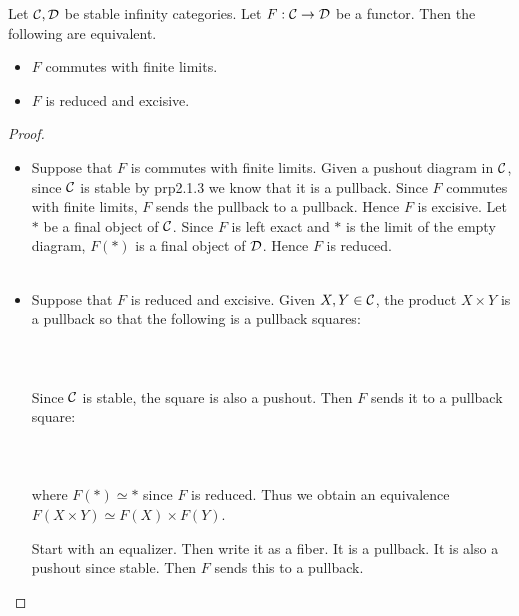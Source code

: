 \documentclass[a4paper]{article}
\begin{document}
\begin{prp}{}{} Let $\mathcal{C},\mathcal{D}$ be stable infinity categories. Let $F:\mathcal{C}\to\mathcal{D}$ be a functor. Then the following are equivalent. 
\begin{itemize}
\item $F$ commutes with finite limits. 
\item $F$ is reduced and excisive. 
\end{itemize} \tcbline
\begin{proof}~\\
\begin{itemize}
\item Suppose that $F$ is commutes with finite limits. Given a pushout diagram in $\mathcal{C}$, since $\mathcal{C}$ is stable by prp2.1.3 we know that it is a pullback. Since $F$ commutes with finite limits, $F$ sends the pullback to a pullback. Hence $F$ is excisive. Let $\ast$ be a final object of $\mathcal{C}$. Since $F$ is left exact and $\ast$ is the limit of the empty diagram, $F(\ast)$ is a final object of $\mathcal{D}$. Hence $F$ is reduced. \\~\\
\item Suppose that $F$ is reduced and excisive. Given $X,Y\in\mathcal{C}$, the product $X\times Y$ is a pullback so that the following is a pullback squares: \\~\\
\\~\\
Since $\mathcal{C}$ is stable, the square is also a pushout. Then $F$ sends it to a pullback square: \\~\\
\\~\\
where $F(\ast)\simeq\ast$ since $F$ is reduced. Thus we obtain an equivalence $F(X\times Y)\simeq F(X)\times F(Y)$. 



Start with an equalizer. Then write it as a fiber. It is a pullback. It is also a pushout since stable. Then $F$ sends this to a pullback. 
\end{itemize}
\end{proof}
\end{prp}
\end{document}
